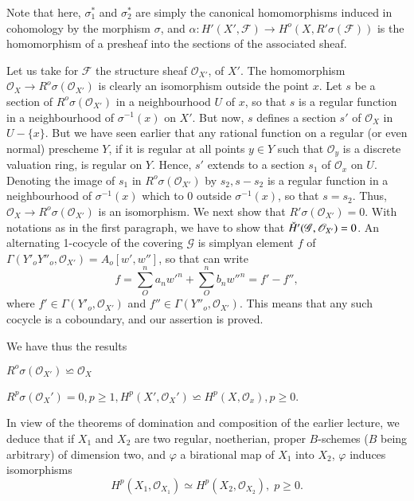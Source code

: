 Note that here, $\sigma^*_1$ and $\sigma^*_2$ are simply the canonical
homomorphisms induced in cohomology by the morphism $\sigma$, and
$\alpha : H' (X', \mathscr{F}) \to H^o (X, R' \sigma (\mathscr{F}))$ is
the homomorphism of a presheaf into the sections of the associated
sheaf. 
 
Let us take for $\mathscr{F}$ the structure sheaf $\mathscr{O}_{X'}$,
of $X'$. The homomorphism $\mathscr{O}_X \to R^o \sigma
(\mathscr{O}_{X'})$  is clearly an isomorphism outside the point
$x$. Let $s$ be a section of $R^o \sigma (\mathscr{O}_{X'})$ in a
neighbourhood $U$ of $x$, so that $s$ is a regular function in a
neighbourhood of $\sigma^{-1}(x)$ on $X'$. But now, $s$ defines a
section $s'$ of $\mathscr{O}_X$ in $U-\{x\}$. But we have seen earlier
that any rational function on a regular (or even normal) prescheme
$Y$, if it is regular at all points $y \in Y$ such that
$\mathscr{O}_y$ is a discrete valuation ring, is regular on
$Y$. Hence, $s'$ extends to a section $s_1$ of $\mathscr{O}_x$ on
$U$. Denoting the image of $s_1$ in $R^o \sigma (\mathscr{O}_{X'})$ by
$s_2, s- s_2$ is a regular function in a neighbourhood of
$\sigma^{-1}(x)$ which to $0$ outside $\sigma^{-1}(x)$, so that
$s=s_2$. Thus, $\mathscr{O}_X \to R^o \sigma (\mathscr{O}_{X'})$ is an
isomorphism. We next show that $R' \sigma(\mathscr{O}_{X'})=0$. With
notations as in the first paragraph, we have to show that
$\check{H}'(\mathscr{G},\mathscr{O}_{X'})=0$. An alternating
1-cocycle of the covering $\mathscr{G}$ is simply\pageoriginale an
element $f$ of $\Gamma (Y'_o Y''_o, \mathscr{O}_{X'})= A_o [w', w'']$,
so that can write  
 $$
 f=\sum\limits_{O}^{n} a_n w'^n + \sum\limits_{O}^{n} b_n w''^n = f' -
 f'',  
 $$
 where $f' \in \Gamma (Y'_o, \mathscr{O}_{X'})$ and $f'' \in \Gamma
 (Y''_o, \mathscr{O}_{X'})$. This means that any such cocycle is a
 coboundary, and our assertion is proved. 
 
We have thus the results

$R^o \sigma (\mathscr{O}_{X'})\backsimeq \mathscr{O}_X$

$R^p \sigma (\mathscr{O}_X')=0 , p\geq 1, H^p(X',
\mathscr{O}_X')\backsimeq H^p (X, \mathscr{O}_x), p \geq 0$. 

In view of the theorems of domination and composition of the earlier
lecture, we deduce that if $X_1$ and $X_2$ are two regular,
noetherian, proper $B$-schemes ($B$ being arbitrary) of dimension two,
and $\varphi$ a birational map of $X_1$ into $X_2$, $\varphi$ induces
isomorphisms 
$$
H^p (X_1, \mathscr{O}_{X_1})\simeq H^p (X_2, \mathscr{O}_{X_2}), \; p\geq
0. 
$$

